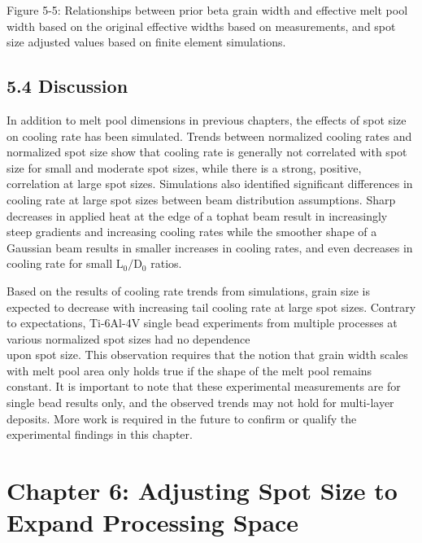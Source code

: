 \documentclass[10pt]{article}
\begin{document}
Figure 5-5: Relationships between prior beta grain width and effective melt pool width based on the original effective widths based on measurements, and spot size adjusted values based on finite element simulations.

\subsection*{5.4 Discussion}
In addition to melt pool dimensions in previous chapters, the effects of spot size on cooling rate has been simulated. Trends between normalized cooling rates and normalized spot size show that cooling rate is generally not correlated with spot size for small and moderate spot sizes, while there is a strong, positive, correlation at large spot sizes. Simulations also identified significant differences in cooling rate at large spot sizes between beam distribution assumptions. Sharp decreases in applied heat at the edge of a tophat beam result in increasingly steep gradients and increasing cooling rates while the smoother shape of a Gaussian beam results in smaller increases in cooling rates, and even decreases in cooling rate for small $\mathrm{L}_{0} / \mathrm{D}_{0}$ ratios.

Based on the results of cooling rate trends from simulations, grain size is expected to decrease with increasing tail cooling rate at large spot sizes. Contrary to expectations, Ti-6Al-4V single bead experiments from multiple processes at various normalized spot sizes had no dependence\\
upon spot size. This observation requires that the notion that grain width scales with melt pool area only holds true if the shape of the melt pool remains constant. It is important to note that these experimental measurements are for single bead results only, and the observed trends may not hold for multi-layer deposits. More work is required in the future to confirm or qualify the experimental findings in this chapter.

\section*{Chapter 6: Adjusting Spot Size to Expand Processing Space}
\end{document}
